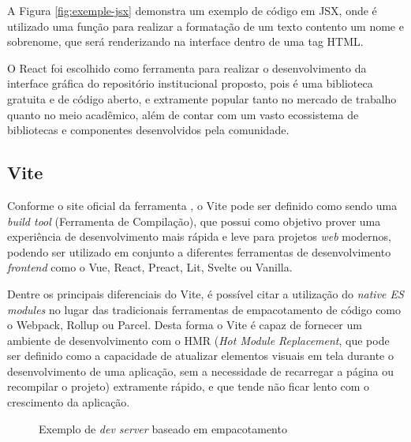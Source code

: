 A Figura \ref{fig:exemple-jsx} demonstra um exemplo de código em JSX, onde é
utilizado uma função para realizar a formatação de um texto contento um
nome e sobrenome, que será renderizando na interface dentro de uma
tag HTML.

O React foi escolhido como ferramenta para realizar o desenvolvimento da
interface gráfica do repositório institucional proposto, pois é uma biblioteca
gratuita e de código aberto, e extramente popular tanto no mercado de trabalho
quanto no meio acadêmico, além de contar com um vasto ecossistema de bibliotecas
e componentes desenvolvidos pela comunidade.

\subsection{Vite}

Conforme o site oficial da ferramenta \cite{Vite:2022}, o Vite pode ser definido
como sendo uma \emph{build tool} (Ferramenta de Compilação), que possui como objetivo
prover uma experiência de desenvolvimento mais rápida e leve para projetos
\emph{web} modernos, podendo ser utilizado em conjunto a diferentes ferramentas de
desenvolvimento \emph{frontend} como o Vue, React, Preact, Lit, Svelte ou Vanilla.

Dentre os principais diferenciais do Vite, é possível citar a utilização do
\emph{native ES modules} no lugar das tradicionais ferramentas de empacotamento
de código como o Webpack, Rollup ou Parcel. Desta forma o Vite é capaz de
fornecer um ambiente de desenvolvimento com o HMR (\emph{Hot Module Replacement},
que pode ser definido como a capacidade de atualizar elementos visuais em tela
durante o desenvolvimento de uma aplicação, sem a necessidade de recarregar a
página ou recompilar o projeto) extramente rápido, e que tende não ficar lento
com o crescimento da aplicação.

\begin{figure}[H]
    \caption{Exemplo de \emph{dev server} baseado em empacotamento}
    \centering
    \label{fig:bundle-based}
\end{figure}

